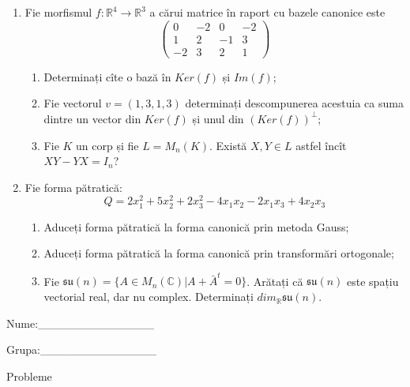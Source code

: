 \documentclass{article}
\begin{document}
\begin{enumerate}
 \item Fie morfismul $f:\mathbb{R}^4 \to \mathbb{R}^3$ a cărui matrice în raport cu bazele canonice este
$$\begin{pmatrix}
0&-2&0&-2\\
1&2&-1&3\\
-2&3&2&1
\end{pmatrix}$$

\begin{enumerate}
\item Determinați cîte o bază în $Ker(f)$ și $Im(f)$;
\item Fie vectorul $v=(1,3,1,3)$ determinați descompunerea acestuia ca suma dintre un vector din $Ker(f)$ și unul din $(Ker(f))^\perp$;
\item Fie $K$ un corp și fie $L=M_n(K)$. Există $X,Y \in L$ astfel încît $XY-YX=I_n$?  
\end{enumerate}
\item Fie forma pătratică:
$$Q= 2x_1^2+5x_2^2+2x_3^2-4x_1x_2-2x_1x_3+4x_2x_3$$

\begin{enumerate}
\item Aduceți forma pătratică la forma canonică prin metoda Gauss;
\item Aduceți forma pătratică la forma canonică prin transformări ortogonale;
\item Fie $\mathfrak{su}(n)=\{ A \in M_n(\mathbb{C}) | A+\bar{A}^t=0\}$. Arătați că $\mathfrak{su}(n)$ este spațiu vectorial real, dar nu complex.
Determinați $dim_{\mathbb{R}}\mathfrak{su}(n)$.
\end{enumerate}
\end{enumerate}
\newpage
\begin{flushright}
Nume:\_\_\_\_\_\_\_\_\_\_\_\_\_\_
 
 
Grupa:\_\_\_\_\_\_\_\_\_\_\_\_\_\_
\end{flushright}
\begin{center}
\vspace{2cm}
{\Large Probleme}
\vspace{2cm}
\end{center}
\end{document}
